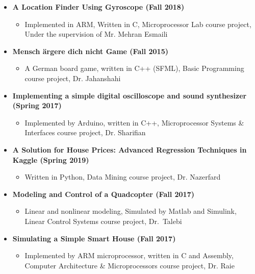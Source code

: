 \begin{itemize}
		\vspace{+1 em}
	\item \textbf{A Location Finder Using Gyroscope (Fall 2018)} 
		\begin{itemize}
			\item  Implemented in ARM, Written in C, Microprocessor Lab course project, Under the supervision of Mr. Mehran Esmaili
		\end{itemize}	
						
						
	\vspace{+1 em}
	\item \textbf{Mensch ärgere dich nicht Game (Fall 2015)} 
		\begin{itemize}
			\item A German board game, written in C++ (SFML), Basic Programming course project, Dr. Jahanshahi
		\end{itemize}

	\vspace{+1 em}
	\item \textbf{Implementing a simple digital oscilloscope and sound synthesizer (Spring 2017)}
		\begin{itemize}
			\item Implemented by Arduino, written in C++, Microprocessor Systems \& Interfaces course project, Dr. Sharifian
		\end{itemize}
		
				\vspace{+1 em}
	\item \textbf{A Solution for House Prices: Advanced Regression Techniques in Kaggle (Spring 2019)} 
		\begin{itemize}
			\item Written in Python, Data Mining course project, Dr. Nazerfard
		\end{itemize}	
		
	\vspace{+1 em}
	\item \textbf{Modeling and Control of a Quadcopter (Fall 2017)} 
		\begin{itemize}
			\item Linear and nonlinear modeling, Simulated by Matlab and Simulink, Linear Control Systems
course project, \mbox{Dr. Talebi}
		\end{itemize}

	\vspace{+1 em}
	\item \textbf{Simulating a Simple Smart House (Fall 2017)}
		\begin{itemize}
			\item Implemented by ARM microprocessor, written in C and Assembly, Computer Architecture \& Microprocessors course project, Dr. Raie
		\end{itemize}


\end{itemize}
